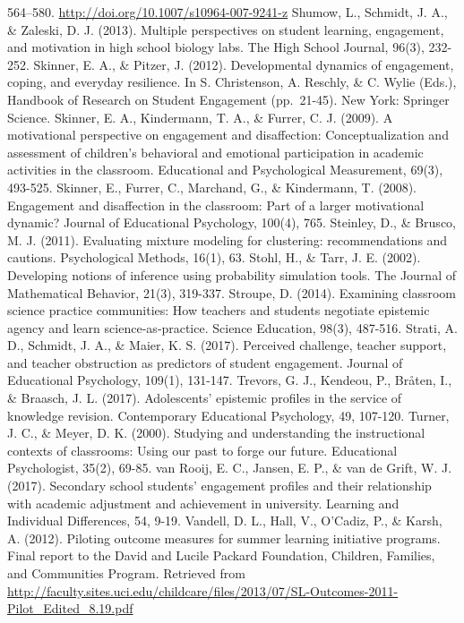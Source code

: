 \documentclass[]{book}
\theoremstyle{definition}
\theoremstyle{definition}
\theoremstyle{definition}
\theoremstyle{remark}
\begin{document}
564--580. \url{http://doi.org/10.1007/s10964-007-9241-z} Shumow, L.,
Schmidt, J. A., \& Zaleski, D. J. (2013). Multiple perspectives on
student learning, engagement, and motivation in high school biology
labs. The High School Journal, 96(3), 232-252. Skinner, E. A., \&
Pitzer, J. (2012). Developmental dynamics of engagement, coping, and
everyday resilience. In S. Christenson, A. Reschly, \& C. Wylie (Eds.),
Handbook of Research on Student Engagement (pp.~21-45). New York:
Springer Science. Skinner, E. A., Kindermann, T. A., \& Furrer, C. J.
(2009). A motivational perspective on engagement and disaffection:
Conceptualization and assessment of children's behavioral and emotional
participation in academic activities in the classroom. Educational and
Psychological Measurement, 69(3), 493-525. Skinner, E., Furrer, C.,
Marchand, G., \& Kindermann, T. (2008). Engagement and disaffection in
the classroom: Part of a larger motivational dynamic? Journal of
Educational Psychology, 100(4), 765. Steinley, D., \& Brusco, M. J.
(2011). Evaluating mixture modeling for clustering: recommendations and
cautions. Psychological Methods, 16(1), 63. Stohl, H., \& Tarr, J. E.
(2002). Developing notions of inference using probability simulation
tools. The Journal of Mathematical Behavior, 21(3), 319-337. Stroupe, D.
(2014). Examining classroom science practice communities: How teachers
and students negotiate epistemic agency and learn science‐as‐practice.
Science Education, 98(3), 487-516. Strati, A. D., Schmidt, J. A., \&
Maier, K. S. (2017). Perceived challenge, teacher support, and teacher
obstruction as predictors of student engagement. Journal of Educational
Psychology, 109(1), 131-147. Trevors, G. J., Kendeou, P., Bråten, I., \&
Braasch, J. L. (2017). Adolescents' epistemic profiles in the service of
knowledge revision. Contemporary Educational Psychology, 49, 107-120.
Turner, J. C., \& Meyer, D. K. (2000). Studying and understanding the
instructional contexts of classrooms: Using our past to forge our
future. Educational Psychologist, 35(2), 69-85. van Rooij, E. C.,
Jansen, E. P., \& van de Grift, W. J. (2017). Secondary school students'
engagement profiles and their relationship with academic adjustment and
achievement in university. Learning and Individual Differences, 54,
9-19. Vandell, D. L., Hall, V., O'Cadiz, P., \& Karsh, A. (2012).
Piloting outcome measures for summer learning initiative programs. Final
report to the David and Lucile Packard Foundation, Children, Families,
and Communities Program. Retrieved from
\url{http://faculty.sites.uci.edu/childcare/files/2013/07/SL-Outcomes-2011-Pilot_Edited_8.19.pdf}
\end{document}
